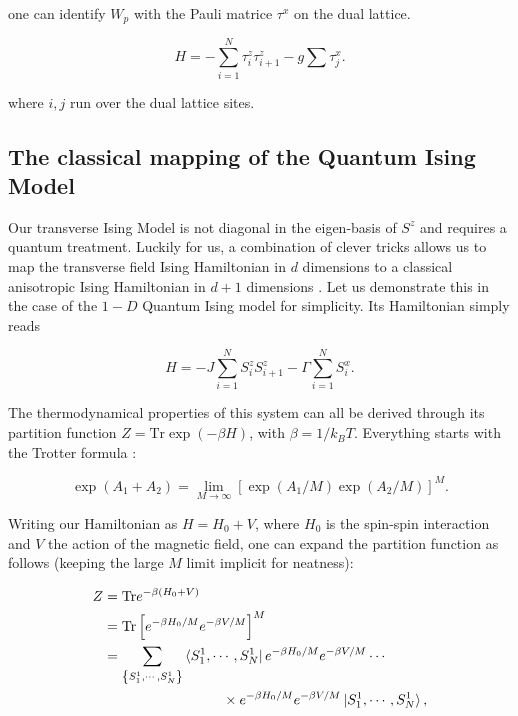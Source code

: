 \documentclass[11pt,openany]{article}
\begin{document}
one can identify $W_p$ with the Pauli matrice $\tau^x$ on  the dual lattice.

\begin{equation}
	H = -\sum_{i=1}^N\tau^z_i\tau^z_{i+1} - g\sum\tau^x_j.
\end{equation}

where $i,j$ run over the dual lattice sites.


\subsection{The classical mapping of the Quantum Ising Model}

Our transverse Ising Model is not diagonal in the eigen-basis of $S^z$ and requires a quantum treatment. Luckily for us, a combination of clever tricks allows us to map the transverse field Ising Hamiltonian in $d$ dimensions to a classical anisotropic Ising Hamiltonian in $d+1$ dimensions \cite{Chakrabarti}. Let us demonstrate this in the case of the $1-D$ Quantum Ising model for simplicity. Its Hamiltonian simply reads

\begin{equation}
	H = -J\sum_{i=1}^N S_i^zS_{i+1}^z - \Gamma\sum_{i=1}^N S_i^x.
\end{equation}

The thermodynamical properties of this system can all be derived through its partition function $Z = \mathrm{Tr}\exp(-\beta H)$, with $\beta=1/k_BT$. Everything starts with the Trotter formula \cite{trotter}:

\begin{equation}
	\exp\left(A_1+A_2\right) =  \lim_{M\to\infty}\left[\exp\left(A_1/M\right)\exp\left(A_2/M\right)\right]^M.
\end{equation}

Writing our Hamiltonian as $H = H_0 + V$, where $H_0$ is the spin-spin interaction and $V$ the action of the magnetic field, one can expand the partition function as follows (keeping the large $M$ limit implicit for neatness):

\begin{align*}
	Z &= \mathrm{Tr}e^{-\beta\left(H_0+V\right)}\\
	&= \mathrm{Tr}\left[e^{-\beta H_0/M}e^{-\beta V/M}\right]^M\\
	&= \sum_{\left\{S^1_1,\cdots,S^1_N\right\}}\bra{S^1_1,\cdots,S^1_N}e^{-\beta H_0/M}e^{-\beta V/M}\cdots\\
	&\hspace{3cm}\times e^{-\beta H_0/M}e^{-\beta V/M}\ket{S^1_1,\cdots,S^1_N},
\end{align*}
\end{document}
